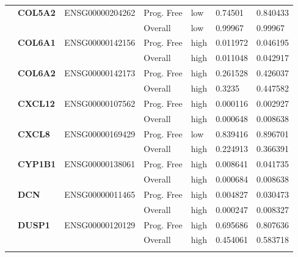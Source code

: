 \begin{spacing}{1}
{\begin{longtable}{|>{\bfseries}p{2cm}|>{\bfseries}p{1.9cm}|p{2.8cm}|p{2cm}|p{2cm}|p{1.5cm}|p{1.5cm}|}
             & COL5A2   & ENSG00000204262 & Prog. Free & low  & 0.74501  & 0.840433 \\
            \hhline{~~~----}
             &          &                 & Overall    & low  & 0.99967  & 0.99967  \\
            \hhline{~======}
             & COL6A1   & ENSG00000142156 & Prog. Free & high & 0.011972 & 0.046195 \\
            \hhline{~~~----}
             &          &                 & Overall    & high & 0.011048 & 0.042917 \\
            \hhline{~======}
             & COL6A2   & ENSG00000142173 & Prog. Free & high & 0.261528 & 0.426037 \\
            \hhline{~~~----}
             &          &                 & Overall    & high & 0.3235   & 0.447582 \\
            \hhline{~======}
             & CXCL12   & ENSG00000107562 & Prog. Free & high & 0.000116 & 0.002927 \\
            \hhline{~~~----}
             &          &                 & Overall    & high & 0.000648 & 0.008638 \\
            \hhline{~======}
             & CXCL8    & ENSG00000169429 & Prog. Free & low  & 0.839416 & 0.896701 \\
            \hhline{~~~----}
             &          &                 & Overall    & high & 0.224913 & 0.366391 \\
            \hhline{~======}
             & CYP1B1   & ENSG00000138061 & Prog. Free & high & 0.008641 & 0.041735 \\
            \hhline{~~~----}
             &          &                 & Overall    & high & 0.000684 & 0.008638 \\
            \hhline{~======}
             & DCN      & ENSG00000011465 & Prog. Free & high & 0.004827 & 0.030473 \\
            \hhline{~~~----}
             &          &                 & Overall    & high & 0.000247 & 0.008327 \\
            \hhline{~======}
             & DUSP1    & ENSG00000120129 & Prog. Free & high & 0.695686 & 0.807636 \\
            \hhline{~~~----}
             &          &                 & Overall    & high & 0.454061 & 0.583718 \\
            \hhline{~======}


\end{longtable}}
\end{spacing}
